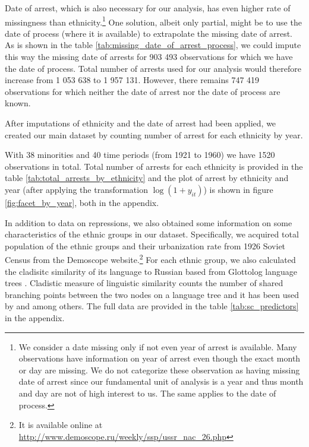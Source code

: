 Date of arrest, which is also necessary for our analysis, has even higher rate of missingness than ethnicity.\footnote{
We consider a date missing only if not even year of arrest is available. Many observations have information on year of arrest even though the exact month or day are missing. We do not categorize these observation as having missing date of arrest since our fundamental unit of analysis is a year and thus month and day are not of high interest to us. The same applies to the date of process.} 
One solution, albeit only partial, might be to use the date of process (where it is available)  to extrapolate the missing date of arrest.
As is shown in the table \ref{tab:missing_date_of_arrest_process}, we could impute this way the missing date of arrests for 903 493 observations for which we have the date of process. 
Total number of arrests used for our analysis would therefore increase from 1 053 638 to  1 957 131.  However, there remains 747 419 observations for which neither the date of arrest nor the date of process are known. 




After imputations of ethnicity and the date of arrest had been applied,  we created our main dataset by counting number of arrest for each ethnicity by year. %

With 38  minorities  and 40 time periods (from 1921 to 1960) we have 1520 observations in total. Total number of arrests for each ethnicity is provided in the table \ref{tab:total_arrests_by_ethnicity} and the plot of arrest by ethnicity and year (after applying the transformation $\log\left(1 + y_{it}\right)$) is shown in figure \ref{fig:facet_by_year}, both in the appendix. 

In addition to data on repressions, we also obtained some information on some characteristics of the  ethnic groups in our dataset. 
Specifically, we acquired total population of the ethnic groups and their urbanization rate from 1926 Soviet Census from the Demoscope website.\footnote{It is available online at \url{http://www.demoscope.ru/weekly/ssp/ussr_nac_26.php}} For each ethnic group, we also calculated the cladisitc similarity of its language to Russian based from Glottolog language trees \citep{hammarstrom_glottolog_2018}.
Cladistic measure of linguistic similarity counts the number of shared branching points between the two nodes on a language tree and it has been used by \citet{fearon_ethnic_2003} and \citet{dickens_ethnolinguistic_2018} among others. 
The full data are provided in the table \ref{tab:sc_predictors} in the appendix.


